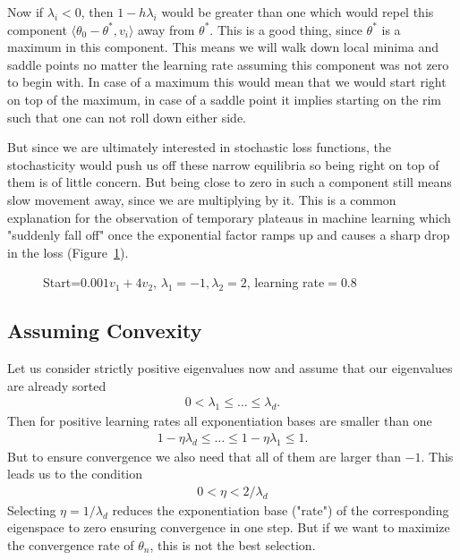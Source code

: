 Now if \(\lambda_i<0\), then \(1-h\lambda_i\) would be greater
than one which would repel this component \(\langle \theta_0 - \theta^*,
v_i\rangle\) away from \(\theta^*\). This is a good thing, since \(\theta^*\)
is a maximum in this component. This means we will walk down local minima and
saddle points no matter the learning rate assuming  this component  was not
zero to begin with. In case of a maximum this would mean that we would start
right on top of the maximum, in case of a saddle point it implies starting on
the rim such that one can not roll down either side.

But since we are ultimately interested in stochastic loss functions, the
stochasticity would push us off these narrow equilibria so being right on
top of them is of little concern. But being close to zero in such a component
still means slow movement away, since we are multiplying by it. This is a
common explanation for the observation of temporary plateaus in machine learning
which "suddenly fall off" once the exponential factor ramps up and causes a
sharp drop in the loss (Figure~\ref{fig: visualize saddlepoint gd}).
%
\begin{figure}[h]
	\centering
	\def\svgwidth{1\textwidth}
	
	\caption{Start=\(0.001v_1+4v_2\), \(\lambda_1=-1, \lambda_2=2\), learning rate\(=0.8\)}
	\label{fig: visualize saddlepoint gd}
\end{figure}

\subsection{Assuming Convexity}

Let us consider strictly positive eigenvalues now and assume that our
eigenvalues are already sorted
%
\begin{align}
	0 < \lambda_1 \le \dots \le \lambda_d.
\end{align}
%
Then for positive learning rates all exponentiation bases are smaller than one
%
\begin{align*}
	1-\eta\lambda_d \le \dots \le 1-\eta\lambda_1 \le 1.
\end{align*}
%
But to ensure convergence we also need that all of them are larger than \(-1\).
This leads us to the condition
\begin{align}\label{eq: learning rate restriction (eigenvalue)}
	0< \eta < 2/\lambda_d
\end{align}
%
Selecting \(\eta = 1/\lambda_d\) reduces the exponentiation base ("rate") of the
corresponding eigenspace to zero ensuring convergence in one step.
But if we want to maximize the convergence rate of \(\theta_n\), this is not
the best selection.

